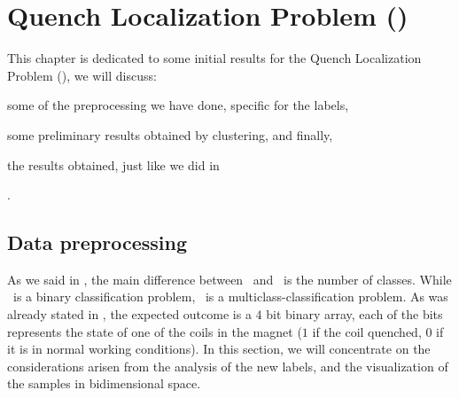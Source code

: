 \chapter{Quench Localization Problem (\qlp)}
\label{chp:qlp}
This chapter is dedicated to some initial results for the Quench Localization Problem (\qlp), we will discuss:
\begin{inparaenum}[(i)]
	\item some of the preprocessing we have done, specific for the labels,
	\item some preliminary results obtained by clustering, and finally,
	\item the results obtained, just like we did in 
\end{inparaenum}.
\section{Data preprocessing}
\label{sec:qlp-preprocessing}
As we said in , the main difference between \qlp\ and \qrp\ is the number of
classes. While \qrp\ is a binary classification problem, \qlp\ is a multiclass-classification
problem. As was already stated in , the expected outcome is a $4$ bit binary array, each of the bits represents the state of one of the coils in the magnet ($1$ if the coil quenched, $0$ if it is in normal working conditions). In this section, we will concentrate on the considerations arisen from the analysis of the new labels, and the visualization of the samples in bidimensional space.

